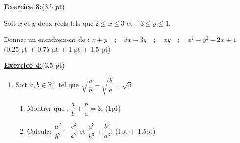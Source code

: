 \documentclass[12pt,a4paper]{article}
\begin{document}
\underline{\large\textbf{Exercice  3:}}(3.5 pt)

Soit $x$ et $y$ deux réels tels que $2\leq x\leq 3$ et $-3\leq y\leq 1$.

Donner un encadrement de : $x + y\quad;\quad 5x - 3y \quad;\quad xy \quad;\quad x^2 - y^2 - 2x + 1$ (0.25 pt + 0.75 pt + 1 pt + 1.5 pt)

\underline{\large\textbf{Exercice  4:}}(3.5 pt)
\begin{enumerate}
	\item Soit $a,b\in\mathbb{R}^*_+$ tel que $\sqrt{\dfrac{a}{b}} + \sqrt{\dfrac{b}{a}} = \sqrt{5}$
   	\begin{enumerate}
   		\item Montrer que : $\dfrac{a}{b} + \dfrac{b}{a} = 3$. (1pt)
   		\item Calculer $\dfrac{a^2}{b^2} + \dfrac{b^2}{a^2}$ et $\dfrac{a^3}{b^3} + \dfrac{b^3}{a^3}$. (1pt + 1.5pt)
   	\end{enumerate}
\end{enumerate}
\end{document}
